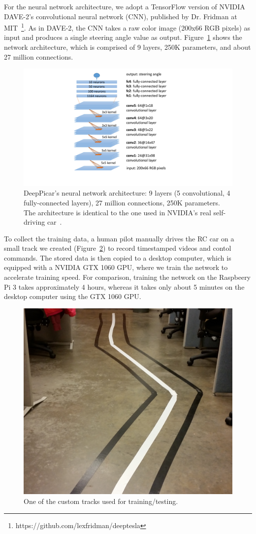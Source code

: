 For the neural network architecture, we adopt a TensorFlow version of
NVIDIA DAVE-2's convolutional neural network (CNN), published by Dr.
Fridman at  MIT~\footnote{https://github.com/lexfridman/deeptesla}. As
in DAVE-2, the CNN takes a raw color image (200x66 RGB pixels)
as input and produces a single steering angle value as
output. Figure~\ref{fig:architecture} shows the network architecture, which
is comprised of 9 layers, 250K parameters, and about 27 million
connections.

\begin{figure}[t]
  \centering
  \includegraphics[width=.4\textwidth]{figs/architecture}
  \caption{DeepPicar's neural network architecture: 9 layers (5
    convolutional, 4 fully-connected layers), 27 million connections,
    250K parameters. The architecture is identical to the one used
    in NVIDIA's real self-driving car~\cite{Bojarski2016}.}
  \label{fig:architecture}
\end{figure}

To collect the training data, a human pilot manually drives the RC car
on a small track we created (Figure~\ref{fig:track}) to record
timestamped videos and contol commands. The stored data is then copied 
to a desktop computer, which is equipped with a NVIDIA GTX 1060 GPU, 
where we train the network to accelerate training speed. 
For comparison, training the network on the Raspbeery Pi 3 takes
approximately 4 hours, whereas it takes only about 5 minutes on the
desktop computer using the GTX 1060 GPU.

\begin{figure}[t]
  \centering
  \includegraphics[width=.4\textwidth]{figs/track_new2}
  \caption{One of the custom tracks used for training/testing.}
  \label{fig:track}
\end{figure}

